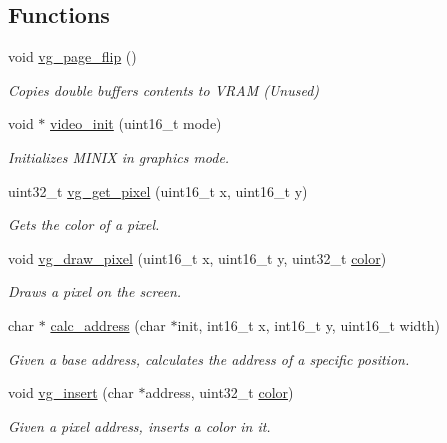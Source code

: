 \subsection*{Functions}
\begin{DoxyCompactItemize}
\item 
void \mbox{\hyperlink{group__video_ga0cd4e06d6e2ee5a7737483d2d36caab1}{vg\+\_\+page\+\_\+flip}} ()
\begin{DoxyCompactList}\small\item\em Copies double buffer\textquotesingle{}s contents to V\+R\+AM (Unused) \end{DoxyCompactList}\item 
void $\ast$ \mbox{\hyperlink{group__video_gad5c198bac564055e1866fd5ac6152308}{video\+\_\+init}} (uint16\+\_\+t mode)
\begin{DoxyCompactList}\small\item\em Initializes M\+I\+N\+IX in graphics mode. \end{DoxyCompactList}\item 
uint32\+\_\+t \mbox{\hyperlink{group__video_ga205ab9910f679634b489672fa90212c3}{vg\+\_\+get\+\_\+pixel}} (uint16\+\_\+t x, uint16\+\_\+t y)
\begin{DoxyCompactList}\small\item\em Gets the color of a pixel. \end{DoxyCompactList}\item 
void \mbox{\hyperlink{group__video_ga26084597ddd2baa0ce4d70003a9492e9}{vg\+\_\+draw\+\_\+pixel}} (uint16\+\_\+t x, uint16\+\_\+t y, uint32\+\_\+t \mbox{\hyperlink{structcolor}{color}})
\begin{DoxyCompactList}\small\item\em Draws a pixel on the screen. \end{DoxyCompactList}\item 
char $\ast$ \mbox{\hyperlink{group__video_ga57014a19e5d9cf805bcf7af1f6bbcec5}{calc\+\_\+address}} (char $\ast$init, int16\+\_\+t x, int16\+\_\+t y, uint16\+\_\+t width)
\begin{DoxyCompactList}\small\item\em Given a base address, calculates the address of a specific position. \end{DoxyCompactList}\item 
void \mbox{\hyperlink{group__video_ga9ce8b7520a298fda9e59cdeffbbd8670}{vg\+\_\+insert}} (char $\ast$address, uint32\+\_\+t \mbox{\hyperlink{structcolor}{color}})
\begin{DoxyCompactList}\small\item\em Given a pixel address, inserts a color in it. \end{DoxyCompactList}\item 

\end{DoxyCompactItemize}
